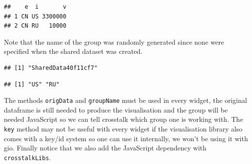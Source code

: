 \documentclass[
]{krantz}
\makeatletter
\newenvironment{Shaded}{\begin{snugshade}}{\end{snugshade}}
\newcommand{\CommentTok}[1]{\textcolor[rgb]{0.37,0.37,0.37}{\textit{#1}}}
\newcommand{\KeywordTok}[1]{\textcolor[rgb]{0.27,0.27,0.27}{\textbf{#1}}}
\newcommand{\NormalTok}[1]{#1}
\newcommand{\OperatorTok}[1]{\textcolor[rgb]{0.43,0.43,0.43}{\textbf{#1}}}
\newenvironment{kframe}{%
\medskip{}
\setlength{\fboxsep}{.8em}
 \def\at@end@of@kframe{}%
 \ifinner\ifhmode%
  \def\at@end@of@kframe{\end{minipage}}%
  \begin{minipage}{\columnwidth}%
 \fi\fi%
 \def\FrameCommand##1{\hskip\@totalleftmargin \hskip-\fboxsep
 \colorbox{shadecolor}{##1}\hskip-\fboxsep
     \hskip-\linewidth \hskip-\@totalleftmargin \hskip\columnwidth}%
 \MakeFramed {\advance\hsize-\width
   \@totalleftmargin\z@ \linewidth\hsize
   \@setminipage}}%
 {\par\unskip\endMakeFramed%
 \at@end@of@kframe}
\renewenvironment{Shaded}{\begin{kframe}}{\end{kframe}}
\makeatother
\begin{document}
\begin{verbatim}
##    e  i       v
## 1 CN US 3300000
## 2 CN RU   10000
\end{verbatim}

Note that the name of the group was randomly generated since none were specified when the shared dataset was created.

\begin{Shaded}
\end{Shaded}

\begin{verbatim}
## [1] "SharedData40f11cf7"
\end{verbatim}

\begin{Shaded}
\end{Shaded}

\begin{verbatim}
## [1] "US" "RU"
\end{verbatim}

The methods \texttt{origData} and \texttt{groupName} must be used in every widget, the original dataframe is still needed to produce the visualisation and the group will be needed JavaScript so we can tell crosstalk which group one is working with. The \texttt{key} method may not be useful with every widget if the visualisation library also comes with a key/id system so one can use it internally, we won't be using it with gio. Finally notice that we also add the JavaScript dependency with \texttt{crosstalkLibs}.
\end{document}
